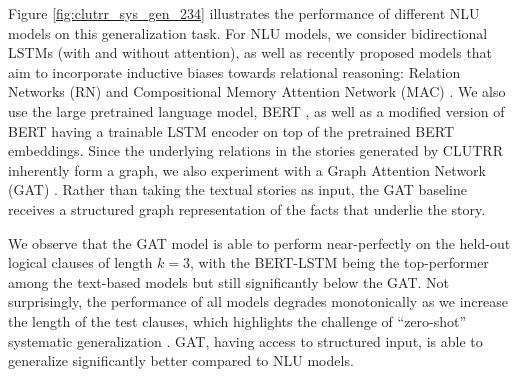 \documentclass[12pt]{article}
\newcommand{\xhdr}[1]{{\noindent\bfseries #1}.}
\begin{document}
Figure \ref{fig:clutrr_sys_gen_234} illustrates the performance of different NLU models on this generalization task. For NLU models, we consider bidirectional LSTMs \citep{hochreiter1997long, cho2014learning} (with and without attention), as well as recently proposed models that aim to incorporate inductive biases towards relational reasoning: Relation Networks (RN) \citep{santoro2017simple} and Compositional Memory Attention Network (MAC) \citep{hudson2018compositional}. We also use the large pretrained language model, BERT \cite{devlin2018bert}, as well as a modified version of BERT having a trainable LSTM encoder on top of the pretrained BERT embeddings. Since the underlying relations in the stories generated by CLUTRR inherently form a graph, we also experiment with a Graph Attention Network (GAT) \citep{Velickovic2017-mh}. Rather than taking the textual stories as input, the GAT baseline receives a structured graph representation of the facts that underlie the story.

We observe that the GAT model is able to perform near-perfectly on the held-out logical clauses of length $k=3$, with the BERT-LSTM being the top-performer among the text-based models but still significantly below the GAT.
Not surprisingly, the performance of all models degrades monotonically as we increase the length of the test clauses, which highlights the challenge of ``zero-shot'' systematic generalization \cite{lake2017generalization, 2018arXiv181107017S}.
GAT, having access to structured input, is able to generalize significantly better compared to NLU models.




\end{document}

